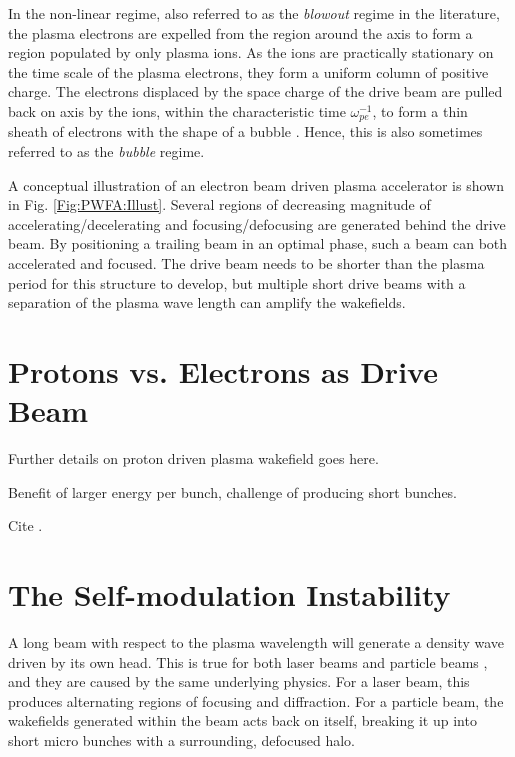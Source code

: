 In the non-linear regime, also referred to as the \textit{blowout} regime in the literature, the plasma electrons are expelled from the region around the axis to form a region populated by only plasma ions. As the ions are practically stationary on the time scale of the plasma electrons, they form a uniform column of positive charge. The electrons displaced by the space charge of the drive beam are pulled back on axis by the ions, within the characteristic time $\omega_{pe}^{-1}$, to form a thin sheath of electrons with the shape of a bubble \cite{lu:2006a,lu:2006}. Hence, this is also sometimes referred to as the \textit{bubble} regime.

A conceptual illustration of an electron beam driven plasma accelerator is shown in Fig. \ref{Fig:PWFA:Illust}. Several regions of decreasing magnitude of accelerating/decelerating and focusing/defocusing are generated behind the drive beam. By positioning a trailing beam in an optimal phase, such a beam can both accelerated and focused. The drive beam needs to be shorter than the plasma period for this structure to develop, but multiple short drive beams with a separation of the plasma wave length can amplify the wakefields.

\section{Protons vs. Electrons as Drive Beam}
\label{Int:PDPWFA}

Further details on proton driven plasma wakefield goes here.

Benefit of larger energy per bunch, challenge of producing short bunches.

Cite \cite{adli:2016a}.

\section{The Self-modulation Instability}
\label{Int:SMI}

A long beam with respect to the plasma wavelength will generate a density wave driven by its own head. This is true for both laser beams \cite{esarey:1994} and particle beams \cite{kumar:2010}, and they are caused by the same underlying physics. For a laser beam, this produces alternating regions of focusing and diffraction. For a particle beam, the wakefields generated within the beam acts back on itself, breaking it up into short micro bunches with a surrounding, defocused halo.

